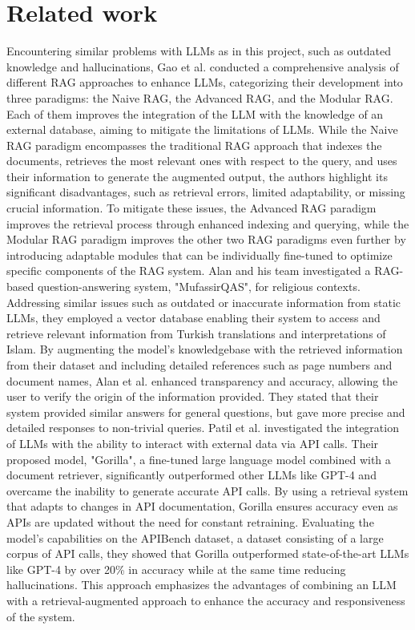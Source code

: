 \documentclass{article}
\begin{document}
\section{Related work}
Encountering similar problems with LLMs as in this project, such as outdated knowledge and hallucinations, Gao et al. \cite{gao2024retrievalaugmented} conducted a comprehensive analysis of different RAG approaches to enhance LLMs, categorizing their development into three paradigms: the Naive RAG, the Advanced RAG, and the Modular RAG. Each of them improves the integration of the LLM with the knowledge of an external database, aiming to mitigate the limitations of LLMs. While the Naive RAG paradigm encompasses the traditional RAG approach that indexes the documents, retrieves the most relevant ones with respect to the query, and uses their information to generate the augmented output, the authors highlight its significant disadvantages, such as retrieval errors, limited adaptability, or missing crucial information. To mitigate these issues, the Advanced RAG paradigm improves the retrieval process through enhanced indexing and querying, while the Modular RAG paradigm improves the other two RAG paradigms even further by introducing adaptable modules that can be individually fine-tuned to optimize specific components of the RAG system.
\newline
Alan and his team \cite{alan2024ragbased} investigated a RAG-based question-answering system, "MufassirQAS", for religious contexts. Addressing similar issues such as outdated or inaccurate information from static LLMs, they employed a vector database enabling their system to access and retrieve relevant information from Turkish translations and interpretations of Islam. By augmenting the model's knowledgebase with the retrieved information from their dataset and including detailed references such as page numbers and document names, Alan et al. enhanced transparency and accuracy, allowing the user to verify the origin of the information provided. They stated that their system provided similar answers for general questions, but gave more precise and detailed responses to non-trivial queries.
\newline
Patil et al. \cite{patil2023gorilla} investigated the integration of LLMs with the ability to interact with external data via API calls. Their proposed model, "Gorilla", a fine-tuned large language model combined with a document retriever, significantly outperformed other LLMs like GPT-4 and overcame the inability to generate accurate API calls. By using a retrieval system that adapts to changes in API documentation, Gorilla ensures accuracy even as APIs are updated without the need for constant retraining. Evaluating the model's capabilities on the APIBench dataset, a dataset consisting of a large corpus of API calls, they showed that Gorilla outperformed state-of-the-art LLMs like GPT-4 by over 20\% in accuracy while at the same time reducing hallucinations. This approach emphasizes the advantages of combining an LLM with a retrieval-augmented approach to enhance the accuracy and responsiveness of the system.
\end{document}
